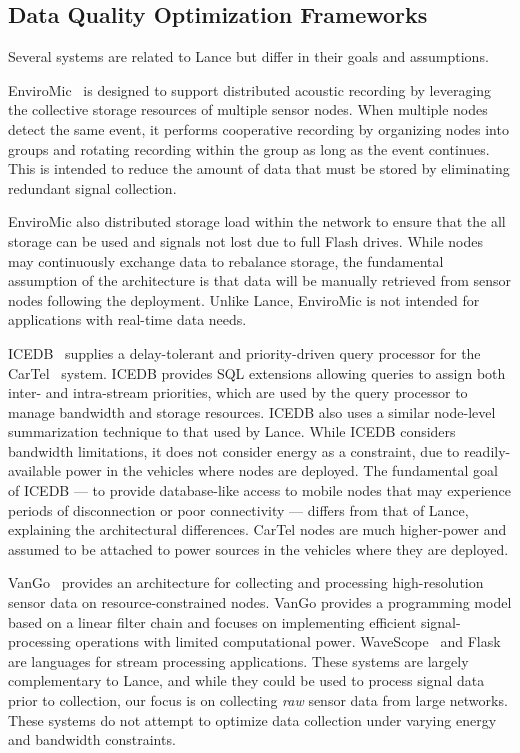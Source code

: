 \subsection{Data Quality Optimization Frameworks}
\label{lance-sec-related}

Several systems are related to Lance but differ in their goals and
assumptions.

EnviroMic~\cite{enviromic} is designed to support distributed acoustic
recording by leveraging the collective storage resources of multiple sensor
nodes. When multiple nodes detect the same event, it performs cooperative
recording by organizing nodes into groups and rotating recording within the
group as long as the event continues. This is intended to reduce the amount
of data that must be stored by eliminating redundant signal collection.

\clearpage

EnviroMic also distributed storage load within the network to ensure that the
all storage can be used and signals not lost due to full Flash drives. While
nodes may continuously exchange data to rebalance storage, the fundamental
assumption of the architecture is that data will be manually retrieved from
sensor nodes following the deployment. Unlike Lance, EnviroMic is not
intended for applications with real-time data needs.

ICEDB~\cite{zhang2007icedb} supplies a delay-tolerant and priority-driven
query processor for the CarTel~\cite{cartel} system. ICEDB provides SQL
extensions allowing queries to assign both inter- and intra-stream
priorities, which are used by the query processor to manage bandwidth and
storage resources. ICEDB also uses a similar node-level summarization
technique to that used by Lance. While ICEDB considers bandwidth limitations,
it does not consider energy as a constraint, due to readily-available power
in the vehicles where nodes are deployed. The fundamental goal of ICEDB ---
to provide database-like access to mobile nodes that may experience periods
of disconnection or poor connectivity --- differs from that of Lance,
explaining the architectural differences. CarTel nodes are much higher-power
and assumed to be attached to power sources in the vehicles where they are
deployed.

VanGo~\cite{vango} provides an architecture for collecting and processing
high-resolution sensor data on resource-constrained nodes. VanGo provides a
programming model based on a linear filter chain and focuses on implementing
efficient signal-processing operations with limited computational power.
WaveScope~\cite{wavescope} and Flask~\cite{flask-tr} are languages for stream
processing applications. These systems are largely complementary to Lance,
and while they could be used to process signal data prior to collection, our
focus is on collecting \textit{raw} sensor data from large networks. These
systems do not attempt to optimize data collection under varying energy and
bandwidth constraints. 


